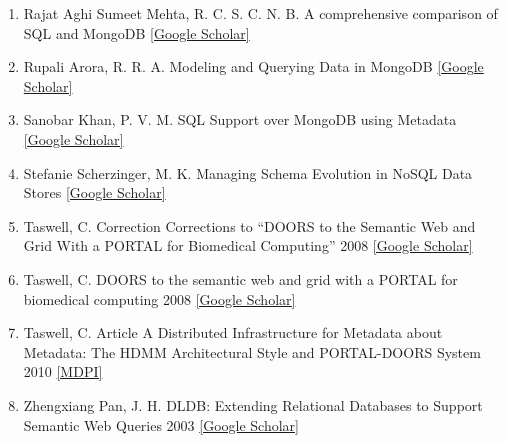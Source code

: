 \documentclass[10pt,twocolumn,twoside]{article}
\begin{document}
\begin{enumerate}
\item Rajat Aghi Sumeet Mehta, R. C. S. C. N. B.
A comprehensive comparison of SQL and MongoDB
 \href{https://scholar.google.com/scholar?q=A+comprehensive+comparison+of+SQL+and+MongoDB&btnG=&hl=en&as_sdt=0%2C47}{[Google Scholar]}

\item Rupali Arora, R. R. A.
Modeling and Querying Data in MongoDB
 \href{https://scholar.google.com/scholar?q=Modeling+and+Querying+Data+in+MongoDB&btnG=&hl=en&as_sdt=0%2C47}{[Google Scholar]}

\item Sanobar Khan, P. V. M.
SQL Support over MongoDB using Metadata
 \href{https://scholar.google.com/scholar?q=SQL+Support+over+MongoDB+using+Metadata&btnG=&hl=en&as_sdt=0%2C47}{[Google Scholar]}

\item Stefanie Scherzinger, M. K.
Managing Schema Evolution in NoSQL Data Stores
 \href{https://scholar.google.com/scholar?q=Managing+Schema+Evolution+in+NoSQL+Data+Stores&btnG=&hl=en&as_sdt=0%2C47}{[Google Scholar]}

\item Taswell, C.
Correction Corrections to “DOORS to the Semantic Web and Grid With a PORTAL for Biomedical Computing”
2008
 \href{https://scholar.google.com/scholar?q=Correction+Corrections+to+%E2%80%9CDOORS+to+the+Semantic+Web+and+Grid+With+a+PORTAL+for+Biomedical+Computing%E2%80%9D&btnG=&hl=en&as_sdt=0%2C47}{[Google Scholar]}

\item Taswell, C.
DOORS to the semantic web and grid with a PORTAL for biomedical computing
2008
 \href{https://scholar.google.com/scholar?q=Correction+Corrections+to+%E2%80%9CDOORS+to+the+Semantic+Web+and+Grid+With+a+PORTAL+for+Biomedical+Computing%E2%80%9D&btnG=&hl=en&as_sdt=0%2C47}{[Google Scholar]}

\item Taswell, C.
Article A Distributed Infrastructure for Metadata about Metadata: The HDMM Architectural Style and PORTAL-DOORS System
2010 \newline
\href{http://www.mdpi.com/1999-5903/2/2/156/htmg}{[MDPI]} 

\item Zhengxiang Pan, J. H.
DLDB: Extending Relational Databases to Support Semantic Web Queries
2003
\href{https://scholar.google.com/scholar?hl=en&q=DLDB%3A+Extending+Relational+Databases+to+Support+Semantic+Web+Queries&btnG=&as_sdt=1%2C47&as_sdtp=}{[Google Scholar]}


\end{enumerate}
\end{document}
